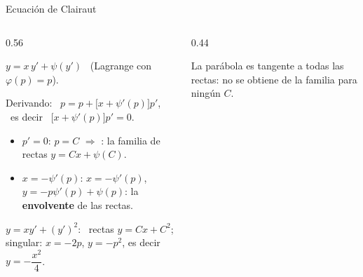 \documentclass[10pt,aspectratio=169]{beamer}
\begin{document}
\begin{frame}{Ecuación de Clairaut}
  \begin{columns}
    \begin{column}{0.56\textwidth}
      \begin{definicion}
        $y=x\,y'+\psi(y')$ \ (Lagrange con $\varphi(p)=p$).
      \end{definicion}
      Derivando: \ $p=p+\big[x+\psi'(p)\big]p'$, \ es decir \ $\big[x+\psi'(p)\big]p'=0$.
      \begin{itemize}
        \item $p'=0$: $p=C$ $\Rightarrow$ : la familia de rectas $y=Cx+\psi(C)$.
        \item $x=-\psi'(p)$:  $x=-\psi'(p)$, $y=-p\psi'(p)+\psi(p)$: la \textbf{envolvente} de las rectas.
      \end{itemize}
      \begin{ejemplo}[9]
        $y=xy'+(y')^2$: \ rectas $y=Cx+C^2$; singular: $x=-2p$, $y=-p^2$, es decir $y=-\dfrac{x^2}4$.
      \end{ejemplo}
    \end{column}
    \begin{column}{0.44\textwidth}
      \centering

      \small La parábola es tangente a todas las rectas: no se obtiene de la familia para ningún $C$.
    \end{column}
  \end{columns}
\end{frame}
\end{document}
